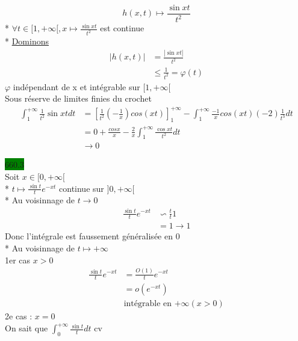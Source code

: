 \documentclass{article}
\begin{document}
\begin{equation*}
    h(x,t) \mapsto \frac{\sin xt}{t^{2}}
\end{equation*}
* \(\forall t \in [1, +\infty[, x \mapsto \frac{\sin xt}{t^{2}}\) 
est continue\\
* \underline{Dominons}
\begin{align*}
  |h(x,t)| &= \frac{|\sin xt|}{t^{2}}\\
           &\leq \frac{1}{t^{2}}=\varphi(t)
\end{align*}
\(\varphi\) indépendant de x et intégrable sur \([1, +\infty[\)\\
Sous réserve de limites finies du crochet
\begin{align*}
  \int_{1}^{+\infty}\frac{1}{t^{2}}\sin xt dt &= [\frac{1}{t^{2}}(-\frac{1}{x})cos(xt)]^{+\infty}_{1} 
  - \int_{1}^{+\infty}\frac{-1}{x}cos(xt)(-2)\frac{1}{t^{3}}dt \\
  &= 0 + \frac{cosx}{x} - \frac{2}{x}\int_{1}^{+\infty}\frac{\cos xt}{t^{2}}dt \\
  &\rightarrow 0 
\end{align*}

\noindent \colorbox{green}{660.3}\\
Soit \(x \in [0, +\infty[\)\\
* \(t \mapsto \frac{\sin t}{t}e^{-xt}\) continue sur \(]0, +\infty[\)\\
* Au voisinnage de \(t \rightarrow 0\)\\ 
\begin{align*}
  \frac{\sin t}{t}e^{-xt} &\backsim \frac{t}{t}1\\
                          &= 1 \to 1
\end{align*}
Donc l'intégrale est faussement généralisée en 0 \\
* Au voisinnage de \(t \mapsto +\infty\)\\
1er cas \(x > 0\)\\
\begin{align*}
  \frac{\sin t}{t}e^{-xt} &= \frac{O(1)}{t}e^{-xt}\\
                          &= o(e^{-xt})\\
                          &\text{intégrable en \(+\infty (x>0)\)}
\end{align*}
2e cas : \(x = 0\)\\
On sait que \(\int_{0}^{+\infty} \frac{\sin t}{t}dt\) cv \\
\end{document}

